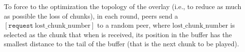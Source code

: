 To force to the optimization the topology of the overlay (i.e., to
reduce as much as possible the loss of chunks), in each round, peers
send a $[\mathtt{request}~\text{lost\_chunk\_number}]$ to a random
peer, where $\text{lost\_chunk\_number}$ is selected as the chunk that
when is received, its position in the buffer has the smallest distance
to the tail of the buffer (that is the next chunk to be played).

\begin{comment}
origin peer of the next chunk stored in the
buffer. This peer has to characteristics: (1) it is not necessary a
neighbor peer, and (2) there is a high probability that this chunk has
been stored in the buffer ``for a long time'', so, if it is not a
neighbor, the link between it and the peer is working fairly well.
\end{comment}

  
